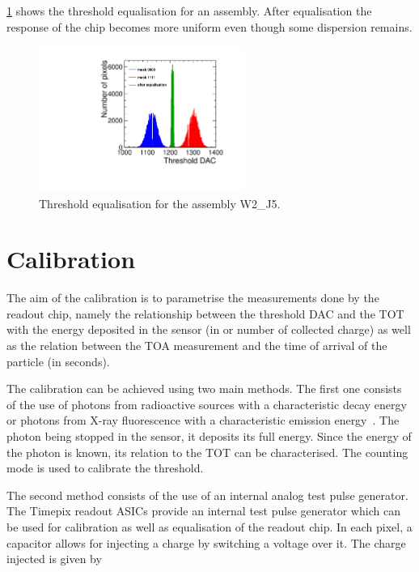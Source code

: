 \cref{fig:THLequalisation} shows the threshold equalisation for an
assembly. After equalisation the response of the chip becomes more
uniform even though some dispersion remains.

\begin{figure}[htbp] 
  \centering
  \includegraphics[width=0.6\textwidth]{./figures/Calibration/THLequalisation_W2_J5.pdf}
  \caption{Threshold equalisation for the assembly W2\_J5.}
  \label{fig:THLequalisation}
\end{figure}

\section{Calibration} \label{sec:calibration} The aim of the
calibration is to parametrise the measurements done by the readout
chip, namely the relationship between the threshold DAC and the TOT
with the energy deposited in the sensor (in \kev or number of
collected charge) as well as the relation between the TOA measurement
and the time of arrival of the particle (in seconds).

The calibration can be achieved using two main methods. The first one
consists of the use of photons from radioactive sources with a
characteristic decay energy or photons from X-ray fluorescence with a
characteristic emission energy~\cite{AlipourTehrani:2054922}. The
photon being stopped in the sensor, it deposits its full energy. Since
the energy of the photon is known, its relation to the TOT can be
characterised. The counting mode is used to calibrate the threshold.

The second method consists of the use of an internal analog test pulse
generator. The Timepix readout ASICs provide an internal test pulse
generator which can be used for calibration as well as equalisation of
the readout chip. In each pixel, a capacitor allows for injecting a
charge by switching a voltage over it. The charge injected is given by

